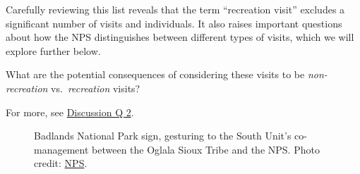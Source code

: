 \documentclass[
  letterpaper,
  DIV=11,
  numbers=noendperiod]{scrartcl}
\begin{document}
Carefully reviewing this list reveals that the term ``recreation visit''
excludes a significant number of visits and individuals. It also raises
important questions about how the NPS distinguishes between different
types of visits, which we will explore further below.

\begin{tcolorbox}[enhanced jigsaw, opacityback=0, toptitle=1mm, colframe=quarto-callout-tip-color-frame, breakable, toprule=.15mm, rightrule=.15mm, left=2mm, colbacktitle=quarto-callout-tip-color!10!white, bottomrule=.15mm, arc=.35mm, bottomtitle=1mm, titlerule=0mm, title=\textcolor{quarto-callout-tip-color}{\faLightbulb}\hspace{0.5em}{Discussion Question 2}, leftrule=.75mm, coltitle=black, opacitybacktitle=0.6, colback=white]

What are the potential consequences of considering these visits to be
\emph{non-recreation} vs.~\emph{recreation} visits?

For more, see
\href{?tab=discussion-\%26-activities\#discussion-2}{Discussion Q 2}.

\end{tcolorbox}

\begin{figure}


\caption{\label{fig-badlands}Badlands National Park sign, gesturing to
the South Unit's co-management between the Oglala Sioux Tribe and the
NPS. Photo credit:
\href{https://www.nps.gov/common/uploads/structured_data/62A55536-BD00-F301-462744BEDD8BA664.jpg?width=800&height=800&mode=crop&quality=90}{NPS}.}

\end{figure}%
\end{document}

